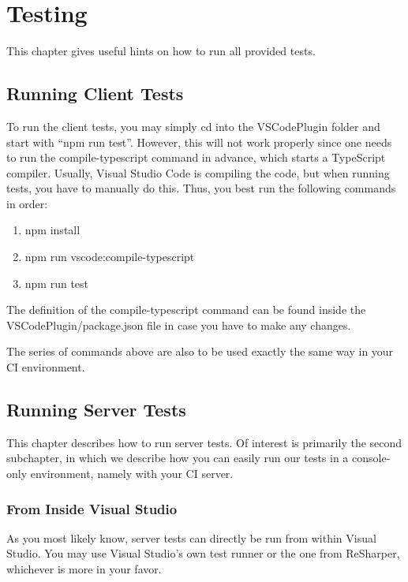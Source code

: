 \documentclass[]{book}
\begin{document}
\chapter{Testing}\label{testing}

This chapter gives useful hints on how to run all provided tests.

\section{ Running Client Tests}\label{running-client-tests}

To run the client tests, you may simply cd into the VSCodePlugin folder and start with ``npm run test''. However, this will not work properly since one needs to run the compile-typescript command in advance, which starts a TypeScript compiler. Usually, Visual Studio Code is compiling the code, but when running tests, you have to manually do this. Thus, you best run the following commands in order:

\begin{enumerate}
\def\labelenumi{\arabic{enumi}.}
\item
  npm install
\item
  npm run vscode:compile-typescript
\item
  npm run test
\end{enumerate}

The definition of the compile-typescript command can be found inside the VSCodePlugin/package.json file in case you have to make any changes.

The series of commands above are also to be used exactly the same way in your CI environment.

\section{Running Server Tests}\label{running-server-tests}

This chapter describes how to run server tests. Of interest is primarily the second subchapter, in which we describe how you can easily run our tests in a console-only environment, namely with your CI server.

\subsection{From Inside Visual Studio}\label{from-inside-visual-studio}

As you most likely know, server tests can directly be run from within Visual Studio. You may use Visual Studio's own test runner or the one from ReSharper, whichever is more in your favor.
\end{document}
